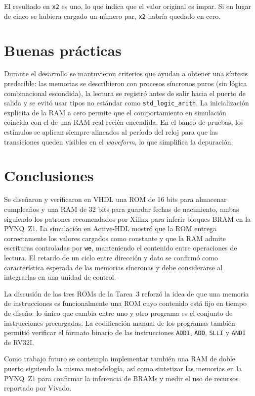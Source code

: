 \documentclass[12pt,letterpaper]{article}
\begin{document}
El resultado en \texttt{x2} es uno, lo que indica que el valor original es impar. Si en lugar de cinco se hubiera cargado un número par, \texttt{x2} habría quedado en cero.

\section{Buenas prácticas}
Durante el desarrollo se mantuvieron criterios que ayudan a obtener una síntesis predecible: las memorias se describieron con procesos síncronos puros (sin lógica combinacional escondida), la lectura se registró antes de salir hacia el puerto de salida y se evitó usar tipos no estándar como \texttt{std\_logic\_arith}. La inicialización explícita de la RAM a cero permite que el comportamiento en simulación coincida con el de una RAM real recién encendida. En el banco de pruebas, los estímulos se aplican siempre alineados al período del reloj para que las transiciones queden visibles en el \textit{waveform}, lo que simplifica la depuración.

\section{Conclusiones}
Se diseñaron y verificaron en VHDL una ROM de 16 bits para almacenar cumpleaños y una RAM de 32 bits para guardar fechas de nacimiento, ambas siguiendo los patrones recomendados por Xilinx para inferir bloques BRAM en la PYNQ~Z1. La simulación en Active-HDL mostró que la ROM entrega correctamente los valores cargados como constante y que la RAM admite escrituras controladas por \texttt{we}, manteniendo el contenido entre operaciones de lectura. El retardo de un ciclo entre dirección y dato se confirmó como característica esperada de las memorias síncronas y debe considerarse al integrarlas en una unidad de control.

La discusión de las tres ROMs de la Tarea~3 reforzó la idea de que una memoria de instrucciones es funcionalmente una ROM cuyo contenido está fijo en tiempo de diseño: lo único que cambia entre uno y otro programa es el conjunto de instrucciones precargadas. La codificación manual de los programas también permitió verificar el formato binario de las instrucciones \texttt{ADDI}, \texttt{ADD}, \texttt{SLLI} y \texttt{ANDI} de RV32I.

Como trabajo futuro se contempla implementar también una RAM de doble puerto siguiendo la misma metodología, así como sintetizar las memorias en la PYNQ~Z1 para confirmar la inferencia de BRAMs y medir el uso de recursos reportado por Vivado.
\end{document}

